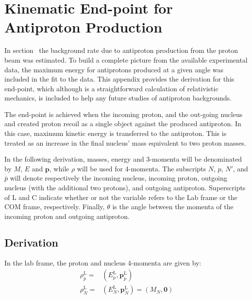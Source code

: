 \chapter{Kinematic End-point for Antiproton Production}
In section~ the background rate due to antiproton production from the proton beam was estimated.
To build a complete picture from the available experimental data, the maximum energy for antiprotons produced at a given angle was included in the fit to the data.
This appendix provides the derivation for this end-point, which although is a straightforward calculation of relativistic mechanics, is included to help any future studies of antiproton backgrounds.

The end-point is achieved when the incoming proton, and the out-going nucleus and created proton recoil as a single object against the produced antiproton.
In this case, maximum kinetic energy is transferred to the antiproton.
This is treated as an increase in the final nucleus' mass equivalent to two proton masses.

\renewcommand{\vec}[1]{\mathbf{#1}}
In the following derivation, masses, energy and 3-momenta will be denominated by $M$, $E$ and $\vec{p}$, while $\rho$ will be used for 4-momenta.
The subscripts $N$, $p$, $N'$, and $\bar{p}$ will denote respectively the incoming nucleus, incoming proton, outgoing nucleus (with the additional two protons), and outgoing antiproton.
Superscripts of L and C indicate whether or not the variable refers to the Lab frame or the \ac{COM} frame, respectively.
Finally, $\theta$ is the angle between the momenta of the incoming proton and outgoing antiproton.

\section{Derivation}
\newcommand{\lab}{\ensuremath{\textrm{L}\xspace}}
\newcommand{\com}{\ensuremath{\textrm{C}\xspace}}
In the lab frame, the proton and nucleus 4-momenta are given by:
\begin{align}
\rho_p^\lab=&(E^\lab_p,\vec{p}^\lab_p)\\
\rho_N^\lab=&(E^\lab_N,\vec{p}^\lab_N)=(M_N,\vec{0})
\end{align}


